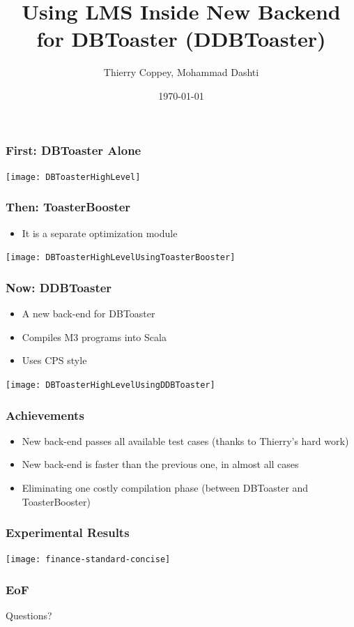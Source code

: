 \documentclass[14pt]{beamer}
\title[ToasterBooster]{Using LMS Inside New Backend for DBToaster (DDBToaster)}
\author{Thierry Coppey, Mohammad Dashti}
\institute[EPFL]
{
Ecole Polytechnique Federale de Lausanne\\
\medskip
{\emph{[first.last]@epfl.ch}}
}
\date{\today}
\begin{document}
%
\begin{frame}
\titlepage
\end{frame}
%

%
\begin{frame}
\frametitle{First: DBToaster Alone}
\texttt{[image: DBToasterHighLevel]}
\end{frame}
%

%
\begin{frame}
\frametitle{Then: ToasterBooster}
\fontsize{18pt}{12}\selectfont
\begin{itemize}
\item It is a separate optimization module
\end{itemize}
\texttt{[image: DBToasterHighLevelUsingToasterBooster]}
\end{frame}
%

%
\begin{frame}
\frametitle{Now: DDBToaster}
\fontsize{18pt}{12}\selectfont
\begin{itemize}
\item A new back-end for DBToaster
\item Compiles M3 programs into Scala
\item Uses CPS style
\end{itemize}
\texttt{[image: DBToasterHighLevelUsingDDBToaster]}
\end{frame}
%

%
\begin{frame}
\frametitle{Achievements}
\begin{itemize}
\item New back-end passes all available test cases (thanks to Thierry's hard work)
\item New back-end is faster than the previous one, in almost all cases
\item Eliminating one costly compilation phase (between DBToaster and ToasterBooster)

\end{itemize}
\end{frame}

%
\begin{frame}
\frametitle{Experimental Results}

\texttt{[image: finance-standard-concise]}

\end{frame}

%
\begin{frame}
\frametitle{EoF}
\begin{center}
Questions?
\end{center}

\end{frame}
\end{document}
